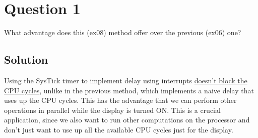 \section*{Question 1}

What advantage does this (ex08) method offer over the previous (ex06) one?

\subsection*{Solution}

Using the SysTick timer to implement delay using interrupts \underline{doesn't block the CPU cycles}, unlike in the previous method, which implements a naive delay that uses up the CPU cycles.
This has the advantage that we can perform other operations in parallel while the display is turned ON.\@
This is a crucial application, since we also want to run other computations on the processor and don't just want to use up all the available CPU cycles just for the display.\@
